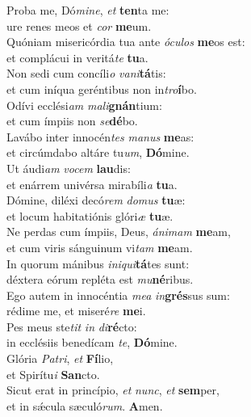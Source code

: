 \evenverse Proba me, Dó\textit{mi}\textit{ne}, \textit{et} \textbf{ten}ta me:~\*\\
\evenverse ure renes meos et \textit{cor} \textbf{me}um.\\
\oddverse Quóniam misericórdia tua ante \textit{ó}\textit{cu}\textit{los} \textbf{me}os est:~\*\\
\oddverse et complácui in veritá\textit{te} \textbf{tu}a.\\
\evenverse Non sedi cum concíli\textit{o} \textit{va}\textit{ni}\textbf{tá}tis:~\*\\
\evenverse et cum iníqua geréntibus non in\textit{tro}\textbf{í}bo.\\
\oddverse Odívi ecclési\textit{am} \textit{ma}\textit{li}\textbf{gnán}tium:~\*\\
\oddverse et cum ímpiis non \textit{se}\textbf{dé}bo.\\
\evenverse Lavábo inter innocén\textit{tes} \textit{ma}\textit{nus} \textbf{me}as:~\*\\
\evenverse et circúmdabo altáre tu\textit{um}, \textbf{Dó}mine.\\
\oddverse Ut áudi\textit{am} \textit{vo}\textit{cem} \textbf{lau}dis:~\*\\
\oddverse et enárrem univérsa mirabíli\textit{a} \textbf{tu}a.\\
\evenverse Dómine, diléxi decó\textit{rem} \textit{do}\textit{mus} \textbf{tu}æ:~\*\\
\evenverse et locum habitatiónis glóri\textit{æ} \textbf{tu}æ.\\
\oddverse Ne perdas cum ímpiis, Deus, \textit{á}\textit{ni}\textit{mam} \textbf{me}am,~\*\\
\oddverse et cum viris sánguinum vi\textit{tam} \textbf{me}am.\\
\evenverse In quorum mánibus \textit{i}\textit{ni}\textit{qui}\textbf{tá}tes sunt:~\*\\
\evenverse déxtera eórum repléta est \textit{mu}\textbf{né}ribus.\\
\oddverse Ego autem in innocéntia \textit{me}\textit{a} \textit{in}\textbf{grés}sus sum:~\*\\
\oddverse rédime me, et miseré\textit{re} \textbf{me}i.\\
\evenverse Pes meus ste\textit{tit} \textit{in} \textit{di}\textbf{ré}cto:~\*\\
\evenverse in ecclésiis benedícam \textit{te}, \textbf{Dó}mine.\\
\oddverse Glória \textit{Pa}\textit{tri}, \textit{et} \textbf{Fí}lio,~\*\\
\oddverse et Spirítu\textit{i} \textbf{San}cto.\\
\evenverse Sicut erat in princípio, \textit{et} \textit{nunc}, \textit{et} \textbf{sem}per,~\*\\
\evenverse et in sǽcula sæculó\textit{rum}. \textbf{A}men.\\
